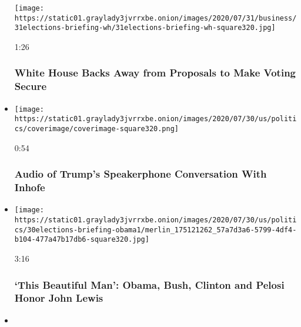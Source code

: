 \begin{itemize}
  \texttt{[image: https://static01.graylady3jvrrxbe.onion/images/2020/07/31/business/31elections-briefing-wh/31elections-briefing-wh-square320.jpg]}

  1:26

  \hypertarget{white-house-backs-away-from-proposals-to-make-voting-secure}{%
  \subsubsection{White House Backs Away from Proposals to Make Voting
  Secure}\label{white-house-backs-away-from-proposals-to-make-voting-secure}}
\item
  \href{https://www.nytimes3xbfgragh.onion/video/us/politics/100000007265038/trump-inhofe-audio-call.html?action=click\&module=video-series-bar\&region=header\&pgtype=Article\&playlistId=video/us-politics}{}

  \texttt{[image: https://static01.graylady3jvrrxbe.onion/images/2020/07/30/us/politics/coverimage/coverimage-square320.png]}

  0:54

  \hypertarget{audio-of-trumps-speakerphone-conversation-with-inhofe}{%
  \subsubsection{Audio of Trump's Speakerphone Conversation With
  Inhofe}\label{audio-of-trumps-speakerphone-conversation-with-inhofe}}
\item
  \href{https://www.nytimes3xbfgragh.onion/video/us/politics/100000007264823/john-lewis-funeral.html?action=click\&module=video-series-bar\&region=header\&pgtype=Article\&playlistId=video/us-politics}{}

  \texttt{[image: https://static01.graylady3jvrrxbe.onion/images/2020/07/30/us/politics/30elections-briefing-obama1/merlin\_175121262\_57a7d3a6-5799-4df4-b104-477a47b17db6-square320.jpg]}

  3:16

  \hypertarget{this-beautiful-man-obama-bush-clinton-and-pelosi-honor-john-lewis}{%
  \subsubsection{`This Beautiful Man': Obama, Bush, Clinton and Pelosi
  Honor John
  Lewis}\label{this-beautiful-man-obama-bush-clinton-and-pelosi-honor-john-lewis}}
\item
  \href{https://www.nytimes3xbfgragh.onion/video/us/politics/100000007264379/john-lewis-funeral.html?action=click\&module=video-series-bar\&region=header\&pgtype=Article\&playlistId=video/us-politics}{}


\end{itemize}
